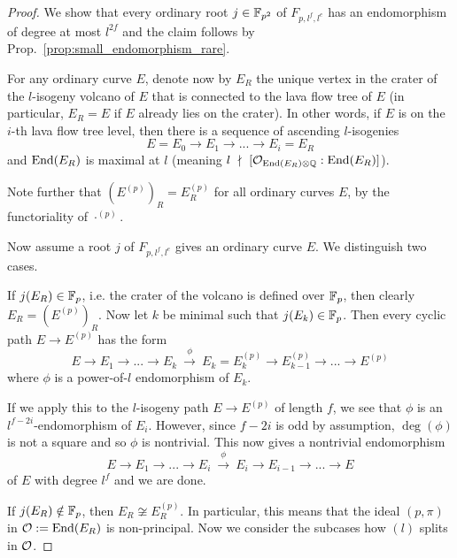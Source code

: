 \begin{proof}
    We show that every ordinary root $j \in \mathbb{F}_{p^2}$ of $F_{p, l^f, l^e}$ has an endomorphism of degree at most $l^{2f}$ and the claim follows by Prop.~\ref{prop:small_endomorphism_rare}.

    For any ordinary curve $E$, denote now by $E_R$ the unique vertex in the crater of the $l$-isogeny volcano of $E$ that is connected to the lava flow tree of $E$ (in particular, $E_R = E$ if $E$ already lies on the crater).
    In other words, if $E$ is on the $i$-th lava flow tree level, then there is a sequence of ascending $l$-isogenies
    \begin{equation*}
        E = E_0 \to E_1 \to ... \to E_i = E_R
    \end{equation*}
    and $\mathrm{End}(E_R)$ is maximal at $l$ (meaning $l \ \nmid \  [\mathcal{O}_{\mathrm{End}(E_R) \otimes \mathbb{Q}} : \mathrm{End}(E_R)]$).

    Note further that $(E^{(p)})_R = E_R^{(p)}$ for all ordinary curves $E$, by the functoriality of $\cdot^{(p)}$.

    Now assume a root $j$ of $F_{p, l^f, l^e}$ gives an ordinary curve $E$.
    We distinguish two cases.

    If $j(E_R) \in \mathbb{F}_p$, i.e. the crater of the volcano is defined over $\mathbb{F}_p$, then clearly $E_R = (E^{(p)})_R$.
    Now let $k$ be minimal such that $j(E_k) \in \mathbb{F}_p$.
    Then every cyclic path $E \to E^{(p)}$ has the form
    \begin{equation*}
        E \to E_1 \to ... \to E_k \ \overset{\phi}{\longrightarrow} \ E_k = E_k^{(p)} \to E_{k - 1}^{(p)} \to ... \to E^{(p)}
    \end{equation*}
    where $\phi$ is a power-of-$l$ endomorphism of $E_k$.

    If we apply this to the $l$-isogeny path $E \to E^{(p)}$ of length $f$, we see that $\phi$ is an $l^{f - 2i}$-endomorphism of $E_i$.
    However, since $f - 2i$ is odd by assumption, $\deg(\phi)$ is not a square and so $\phi$ is nontrivial.
    This now gives a nontrivial endomorphism
    \begin{equation*}
        E \to E_1 \to ... \to E_i \ \overset{\phi}{\longrightarrow} \ E_i \to E_{i - 1} \to ... \to E
    \end{equation*}
    of $E$ with degree $l^f$ and we are done.

    If $j(E_R) \notin \mathbb{F}_p$, then $E_R \not\cong E^{(p)}_R$.
    In particular, this means that the ideal $(p, \pi)$ in $\mathcal{O} := \mathrm{End}(E_R)$ is non-principal.
    Now we consider the subcases how $(l)$ splits in $\mathcal{O}$.


\end{proof}
